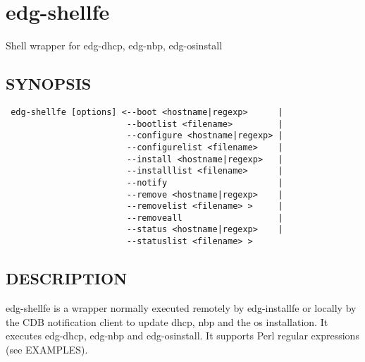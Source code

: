 \section{edg-shellfe\label{edg-shellfe}}


Shell wrapper for edg-dhcp, edg-nbp, edg-osinstall

\subsection*{SYNOPSIS\label{edg-shellfe_SYNOPSIS}}
\begin{verbatim}
 edg-shellfe [options] <--boot <hostname|regexp>      |
                        --bootlist <filename>         |
                        --configure <hostname|regexp> |
                        --configurelist <filename>    |
                        --install <hostname|regexp>   |
                        --installlist <filename>      |
                        --notify                      |
                        --remove <hostname|regexp>    |
                        --removelist <filename> >     |
                        --removeall                   |
                        --status <hostname|regexp>    |
                        --statuslist <filename> >
\end{verbatim}
\subsection*{DESCRIPTION\label{edg-shellfe_DESCRIPTION}}


edg-shellfe is a wrapper normally executed remotely by edg-installfe
or locally by the CDB notification client to update
dhcp, nbp and the os installation. It executes edg-dhcp, edg-nbp and edg-osinstall.
It supports Perl regular expressions (see EXAMPLES).

